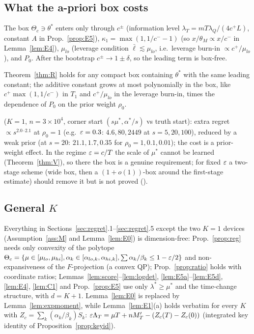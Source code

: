 \subsection{What the a-priori box costs}\label{sec:boxcost}

The box $\Theta_c\ni\theta^*$ enters only through $c^\pm$ (information level $\lambda_T=mT\lambda_Q/(4c^+L)$, constant $A$ in Prop.~\ref{prop:E5}), $\kappa_1=\max(1,1/c^--1)$ (so $x/\theta_M\propto x/c^-$ in Lemma~\ref{lem:E4}), $\mu_{lo}$ (leverage condition $\bar\ell\lesssim\mu_{lo}$, i.e.\ leverage burn-in $\propto c^+/\mu_{lo}$), and $P_0$. After the bootstrap $c^\pm\to1\pm\delta$, so the leading term is box-free.

\begin{proposition}\label{prop:boxcost}\Ps{}
Theorem~\ref{thm:R} holds for any compact box containing $\theta^*$ with the same leading constant; the additive constant grows at most polynomially in the box, like $c^+\max(1,1/c^-)$ in $T_1$ and $c^+/\mu_{lo}$ in the leverage burn-in, times the dependence of $P_0$ on the prior weight $\rho_0$.
\end{proposition}
\Nt{} ($K=1$, $n=3\times10^4$, corner start $(s\mu^*,\alpha^*/s)$ vs truth start): extra regret $\propto s^{2.0\text{--}2.1}$ at $\rho_0=1$ (e.g.\ $\varepsilon=0.3$: $4.6,80,2449$ at $s=5,20,100$), reduced by a weak prior (at $s=20$: $21.1,1.7,0.35$ for $\rho_0=1,0.1,0.01$); the cost is a prior-weight effect. In the regime $\varepsilon=c/T$ the scale of $\mu^*$ cannot be learned (Theorem~\ref{thm:V}), so there the box is a genuine requirement; for fixed $\varepsilon$ a two-stage scheme (wide box, then a $(1+o(1))$-box around the first-stage estimate) should remove it but is not proved (\Ot{}).

\subsection{General $K$}\label{sec:generalK}

Everything in Sections~\ref{sec:regret}.1--\ref{sec:regret}.5 except the two $K=1$ devices (Assumption~\ref{ass:M} and Lemma~\ref{lem:E0}) is dimension-free: Prop.~\ref{prop:reg} needs only convexity of the polytope $\Theta_c=\{\mu\in[\mu_{lo},\mu_{hi}],\alpha_k\in[\alpha_{lo,k},\alpha_{hi,k}],\sum\alpha_k/\beta_k\le1-\varepsilon/2\}$ and non-expansiveness of the $F$-projection (a convex QP); Prop.~\ref{prop:ratio} holds with coordinate ratios; Lemmas~\ref{lem:score}--\ref{lem:logdet}, \ref{lem:E5a}--\ref{lem:E5d}, \ref{lem:E4}, \ref{lem:C1} and Prop.~\ref{prop:E5} use only $\lambda^*\ge\mu^*$ and the time-change structure, with $d=K+1$. Lemma~\ref{lem:E0} is replaced by Lemma~\ref{lem:expmoment}, while Lemma~\ref{lem:E1}(a) holds verbatim for every $K$ with $Z_c=\sum_k(\alpha_k/\beta_k)S_k$: $\varepsilon\Lambda_T=\mu T+nM'_T-(Z_c(T)-Z_c(0))$ (integrated key identity of Proposition~\ref{prop:keyid}).

